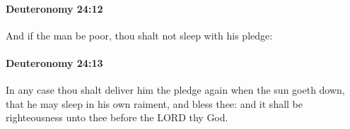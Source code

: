 		\paragraph{Deuteronomy 24:12} %
			\label{DEUTERONOMY-24-12}

			And if the man be poor, thou shalt not sleep with his pledge:


		\paragraph{Deuteronomy 24:13} %
			\label{DEUTERONOMY-24-13}

			In any case thou shalt deliver him the pledge again when the sun goeth down, that he may sleep in his own raiment, and bless thee: and it shall be righteousness unto thee before the LORD thy God.


